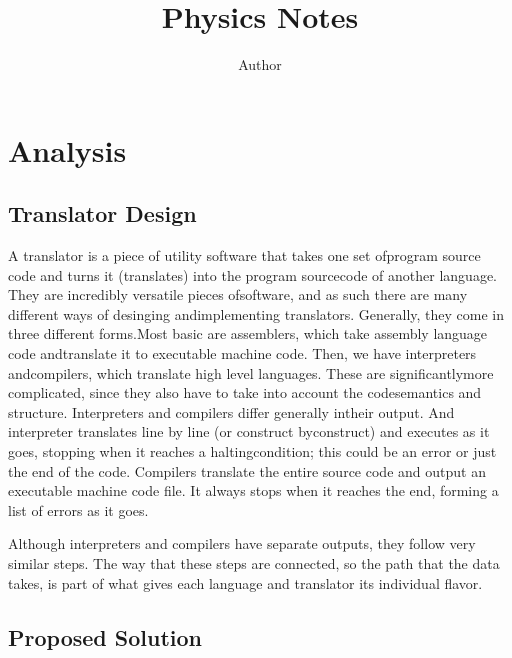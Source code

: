 \documentclass[11pt]{article}
\title{Physics Notes}
\author{Author}
\begin{document}
\maketitle

\tableofcontents

\section{Analysis}

\hypertarget{translator-design}{%
\subsection{Translator Design}\label{translator-design}}

A translator is a piece of utility software that takes one set ofprogram source code and turns it (translates) into the program sourcecode of another language. They are incredibly versatile pieces ofsoftware, and as such there are many different ways of desinging andimplementing translators. Generally, they come in three different forms.Most basic are assemblers, which take assembly language code andtranslate it to executable machine code. Then, we have interpreters andcompilers, which translate high level languages. These are significantlymore complicated, since they also have to take into account the codesemantics and structure. Interpreters and compilers differ generally intheir output. And interpreter translates line by line (or construct byconstruct) and executes as it goes, stopping when it reaches a haltingcondition; this could be an error or just the end of the code. Compilers
translate the entire source code and output an executable machine code
file. It always stops when it reaches the end, forming a list of errors
as it goes.

Although interpreters and compilers have separate outputs, they follow
very similar steps. The way that these steps are connected, so the path
that the data takes, is part of what gives each language and translator
its individual flavor.

\hypertarget{proposed-solution}{%
\subsection{Proposed Solution}\label{proposed-solution}}
\end{document}
